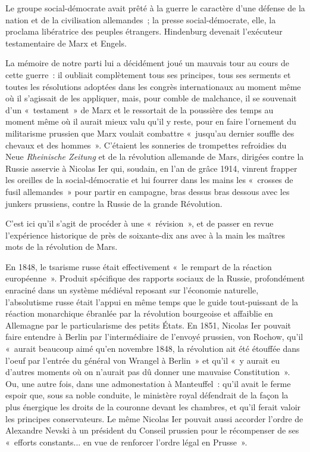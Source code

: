 \documentclass[french,twoside]{book} %
\begin{document}
\noindent Le groupe social-démocrate avait prêté à la guerre le caractère d’une défense de la nation et de la civilisation allemandes ; la presse social-démocrate, elle, la proclama libératrice des peuples étrangers. Hindenburg devenait l’exécuteur testamentaire de Marx et Engels.\par
La mémoire de notre parti lui a décidément joué un mauvais tour au cours de cette guerre : il oubliait complètement tous ses principes, tous ses serments et toutes les résolutions adoptées dans les congrès internationaux au moment même où il s’agissait de les appliquer, mais, pour comble de malchance, il se souvenait d’un « testament » de Marx et le ressortait de la poussière des temps au moment même où il aurait mieux valu qu’il y reste, pour en faire l’ornement du militarisme prussien que Marx voulait combattre « jusqu’au dernier souffle des chevaux et des hommes ». C'étaient les sonneries de trompettes refroidies du Neue \emph{Rheinische Zeitung} et de la révolution allemande de Mars, dirigées contre la Russie asservie à Nicolas Ier qui, soudain, en l’an de grâce 1914, vinrent frapper les oreilles de la social-démocratie et lui fourrer dans les mains les « crosses de fusil allemandes » pour partir en campagne, bras dessus bras dessous avec les junkers prussiens, contre la Russie de la grande Révolution.\par
C'est ici qu’il s’agit de procéder à une « révision », et de passer en revue l’expérience historique de près de soixante-dix ans avec à la main les maîtres mots de la révolution de Mars.\par
En 1848, le tsarisme russe était effectivement « le rempart de la réaction européenne ». Produit spécifique des rapports sociaux de la Russie, profondément enraciné dans un système médiéval reposant sur l’économie naturelle, l’absolutisme russe était l’appui en même temps que le guide tout-puissant de la réaction monarchique ébranlée par la révolution bourgeoise et affaiblie en Allemagne par le particularisme des petits États. En 1851, Nicolas Ier pouvait faire entendre à Berlin par l’intermédiaire de l’envoyé prussien, von Rochow, qu’il « aurait beaucoup aimé qu’en novembre 1848, la révolution ait été étouffée dans l’oeuf par l’entrée du général von Wrangel à Berlin » et qu’il « y aurait eu d’autres moments où on n’aurait pas dû donner une mauvaise Constitution ». Ou, une autre fois, dans une admonestation à Manteuffel : qu’il avait le ferme espoir que, sous sa noble conduite, le ministère royal défendrait de la façon la plus énergique les droits de la couronne devant les chambres, et qu’il ferait valoir les principes conservateurs. Le même Nicolas Ier pouvait aussi accorder l’ordre de Alexandre Nevski à un président du Conseil prussien pour le récompenser de ses « efforts constants... en vue de renforcer l’ordre légal en Prusse ».\par
\end{document}
